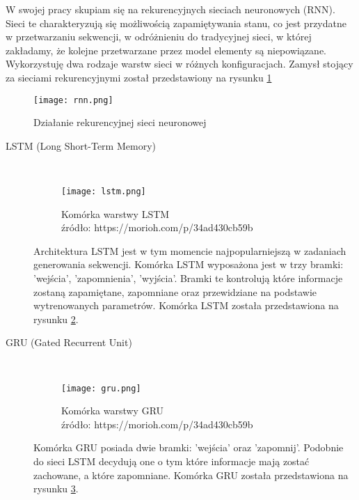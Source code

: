 W swojej pracy skupiam się na rekurencyjnych sieciach neuronowych (RNN). Sieci te charakteryzują się możliwością zapamiętywania stanu, co jest przydatne 
w przetwarzaniu sekwencji, w odróżnieniu do tradycyjnej sieci, w której zakładamy, że kolejne przetwarzane przez model elementy są niepowiązane. Wykorzystuję
dwa rodzaje warstw sieci w różnych konfiguracjach. Zamysł stojący za sieciami rekurencyjnymi został przedstawiony na rysunku \ref{fig:rnn}
\begin{figure}[!h]
	\caption{Działanie rekurencyjnej sieci neuronowej}
    \label{fig:rnn}
    \centering \texttt{[image: rnn.png]}
\end{figure}
\begin{description}
    \item[LSTM (Long Short-Term Memory) \cite{lstm}] 
    \hfill \\ 
    \begin{figure}[!h]
    \captionsetup{justification=centering}
	\caption{Komórka warstwy LSTM\\źródło: https://morioh.com/p/34ad430cb59b}
    \label{fig:lstm}
    \centering \texttt{[image: lstm.png]}
\end{figure}   
    Architektura LSTM jest w tym momencie najpopularniejszą w zadaniach generowania sekwencji. Komórka LSTM 
    wyposażona jest w trzy bramki: 'wejścia',  'zapomnienia', 'wyjścia'. Bramki te kontrolują które informacje zostaną zapamiętane, zapomniane
    oraz przewidziane na podstawie wytrenowanych parametrów. Komórka LSTM została przedstawiona na rysunku \ref{fig:lstm}. 
    \\
    \item[GRU (Gated Recurrent Unit) \cite{gru}] 
    \hfill \\ 
    \begin{figure}[!h]
        \captionsetup{justification=centering} 
        \caption{Komórka warstwy GRU\\źródło: https://morioh.com/p/34ad430cb59b}
        \label{fig:gru}
        \centering \texttt{[image: gru.png]}
    \end{figure}  
        Komórka GRU posiada dwie bramki: 'wejścia' oraz 'zapomnij'. Podobnie do sieci LSTM 
        decydują one o tym które informacje mają zostać zachowane, a które zapomniane. Komórka GRU została przedstawiona 
        na rysunku \ref{fig:gru}.
        \\
  \end{description}


